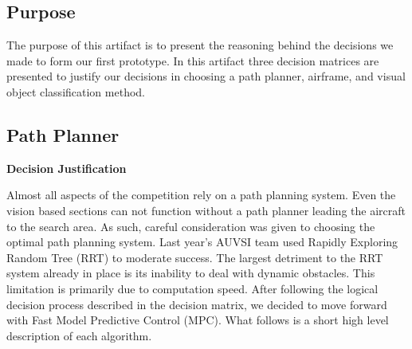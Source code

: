 
\begin{artifacttable}
\end{artifacttable}

\subsection{Purpose}

The purpose of this artifact is to present the reasoning behind the decisions we made to form our first prototype. In this artifact three decision matrices are presented to justify our decisions in choosing a path planner, airframe, and visual object classification method.

\subsection{Path Planner}

\textbf{Decision Justification}

Almost all aspects of the competition rely on a path planning system. Even the vision based sections can not function without a path planner leading the aircraft to the search area. As such, careful consideration was given to choosing the optimal path planning system. Last year’s AUVSI team used Rapidly Exploring Random Tree (RRT) to moderate success. The largest detriment to the RRT system already in place is its inability to deal with dynamic obstacles. This limitation is primarily due to computation speed. After following the logical decision process described in the decision matrix, we decided to move forward with Fast Model Predictive Control (MPC). What follows is a short high level description of each algorithm.

